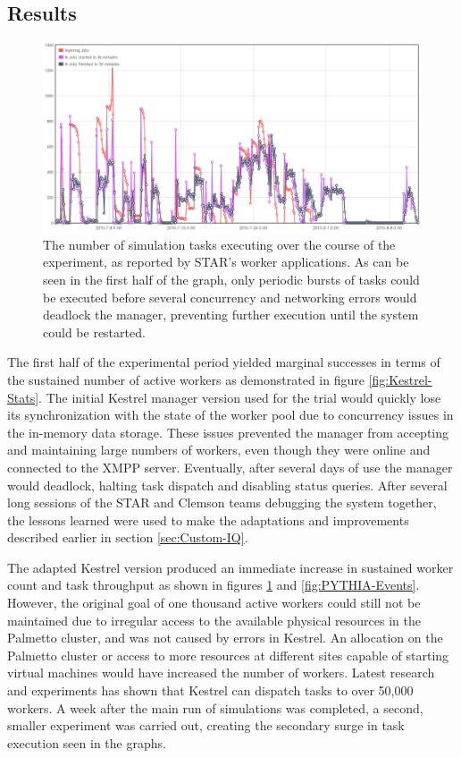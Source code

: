 \subsection{Results}

%
\begin{figure}
\includegraphics[width=\columnwidth]{figures/running_jobs}
\caption{\label{fig:Running-Jobs} The number of simulation tasks executing
over the course of the experiment, as reported by STAR's worker applications.
As can be seen in the first half of the graph, only periodic bursts
of tasks could be executed before several concurrency and networking
errors would deadlock the manager, preventing further execution until
the system could be restarted.}
\end{figure}


The first half of the experimental period yielded marginal successes
in terms of the sustained number of active workers as demonstrated
in figure \ref{fig:Kestrel-Stats}. The initial Kestrel manager version
used for the trial would quickly lose its synchronization with the
state of the worker pool due to concurrency issues in the in-memory
data storage. These issues prevented the manager from accepting and
maintaining large numbers of workers, even though they were online
and connected to the XMPP server. Eventually, after several days of
use the manager would deadlock, halting task dispatch and disabling
status queries. After several long sessions of the STAR and Clemson
teams debugging the system together, the lessons learned were used
to make the adaptations and improvements described earlier in section
\ref{sec:Custom-IQ}. 

The adapted Kestrel version produced an immediate increase in sustained
worker count and task throughput as shown in figures \ref{fig:Running-Jobs}
and \ref{fig:PYTHIA-Events}. However, the original goal of one thousand
active workers could still not be maintained due to irregular access
to the available physical resources in the Palmetto cluster, and was
not caused by errors in Kestrel. An allocation on the Palmetto cluster
or access to more resources at different sites capable of starting
virtual machines would have increased the number of workers. Latest
research and experiments has shown that Kestrel can dispatch tasks
to over 50,000 workers. A week after the main run of simulations was
completed, a second, smaller experiment was carried out, creating
the secondary surge in task execution seen in the graphs.

